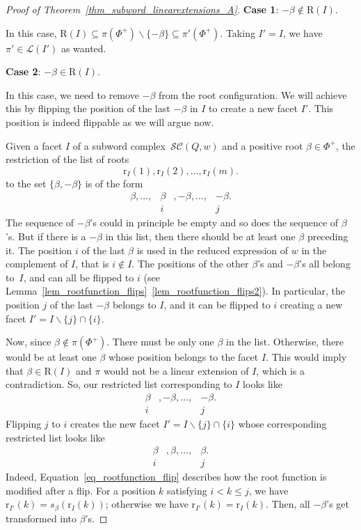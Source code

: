 \documentclass{amsart}
\theoremstyle{definition}
\newcommand{\linearExtensions}{\mathcal{L}} %
\newcommand{\subwordComplex}{\mathcal{SC}} %
\newcommand{\Roots}{\mathrm{R}} %
\newcommand{\rootFunction}[2]{\mathrm{r}_{#1}(#2)} %
\begin{document}
\begin{proof}[Proof of Theorem~\ref{thm_subword_linearextensions_A}]
\medskip
{\bf Case 1}: $-\beta \notin \Roots(I)$.

In this case, 
$\Roots(I)\subseteq \pi(\Phi^+) \smallsetminus \{-\beta\} \subseteq \pi'(\Phi^+)$.
Taking $I'=I$, we have 
$\pi'\in \linearExtensions(I')$ 
as wanted. 

\medskip
{\bf Case 2}: $-\beta \in \Roots(I)$.

In this case, we need to remove $-\beta$ from the root configuration. We will achieve this by flipping the position of the last $-\beta$ in $I$ to create a new facet $I'$. This position is indeed flippable as we will argue now.  

Given a facet $I$ of a subword complex~$\subwordComplex(Q,w)$ and a positive root $\beta\in \Phi^+$, the restriction of the list of roots 
\[
\rootFunction{I}{1}, \rootFunction{I}{2}, \dots , \rootFunction{I}{m}.
\]
to the set $\{\beta,-\beta\}$ is of the form
\[
\begin{array}{cccc}
  \beta, \dots , & \beta &, -\beta, \dots, &-\beta.\\
     & i && j
\end{array}
\]
The sequence of $-\beta$'s could in principle be empty and so does the sequence of $\beta$'s. But if there is a $-\beta$ in this list, then there should be at least one $\beta$ preceding it. The position $i$ of the last $\beta$ is used in the reduced expression of $w$ in the complement of $I$, that is $i\notin I$. The positions of the other $\beta$'s and $-\beta$'s all belong to~$I$, and can all be flipped to $i$ (see Lemma~\ref{lem_rootfunction_flips}~\eqref{lem_rootfunction_flips2}).    
In particular, the position $j$ of the last $-\beta$ belongs to $I$, and it can be flipped to $i$ creating a new facet $I'=I\smallsetminus \{j\} \cap \{i\}$. 

Now, since $\beta\notin \pi(\Phi^+)$. There must be only one $\beta$ in the list. Otherwise, there would be at least one $\beta$ whose position belongs to the facet $I$. This would imply that $\beta\in \Roots(I)$ and $\pi$ would not be a linear extension of $I$, which is a contradiction. So, our restricted list corresponding to $I$ looks like
\begin{equation}
\begin{array}{ccc}
  \beta &, -\beta, \dots, &-\beta.\\
      i && j
\end{array}    
\end{equation}
Flipping $j$ to $i$ creates the new facet $I'=I\smallsetminus \{j\} \cap \{i\}$ whose corresponding restricted list looks like
\begin{equation}
\begin{array}{ccc}
  \beta &, \beta, \dots, &\beta.\\
      i && j
\end{array}    
\end{equation}
Indeed, Equation~\eqref{eq_rootfunction_flip} describes how the root function is modified after a flip. For a position $k$ satisfying $i<k\leq j$, we have $\rootFunction{I'}{k}=s_\beta (\rootFunction{I}{k})$; otherwise we have $\rootFunction{I'}{k}=\rootFunction{I}{k}$.
Then, all $-\beta$'s get transformed into $\beta$'s. 


\end{proof}
\end{document}
